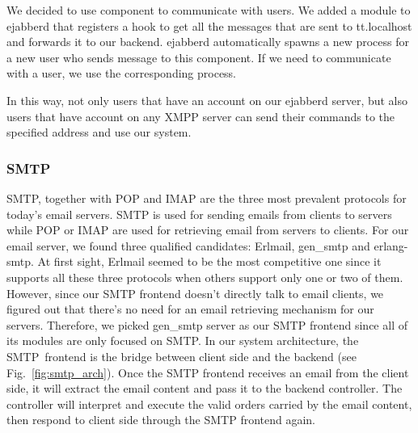 \documentclass[11pt,a4paper]{report}
\begin{document}
We decided to use component to communicate with users. We added a module to
ejabberd that registers a hook to get all the messages that are sent to
tt.localhost and forwards it to our backend. ejabberd automatically spawns a
new process for a new user who sends message to this component.
If we need to communicate with a user, we use the corresponding process.

In this way, not only users that have an account on our ejabberd server, but
also users that have account on any XMPP server can send their commands to the
specified address and use our system.

\subsubsection{SMTP}
SMTP, together with POP and IMAP are the three most prevalent protocols for
today's email servers.
SMTP is used for sending emails from clients to servers while POP or IMAP
are used for retrieving email from servers to clients.
For our email server, we found three qualified candidates: Erlmail, gen\_smtp
and erlang-smtp.
At first sight, Erlmail seemed to be the most competitive one since it
supports all these three protocols when others support only one or two of them.
However, since our SMTP frontend doesn't directly talk to email clients, we
figured out that there's no need for an email retrieving mechanism for our
servers. Therefore, we picked gen\_smtp server as our SMTP frontend since all
of its modules are only focused on SMTP. In our system architecture, the
SMTP~frontend is the bridge between client side and the backend
(see Fig.~\ref{fig:smtp_arch}).
Once the SMTP frontend receives an email from the client side, it will extract
the email content and pass it to the backend controller. The controller will
interpret and execute the valid orders carried by the email content, then
respond to client side through the SMTP frontend again.
\end{document}
